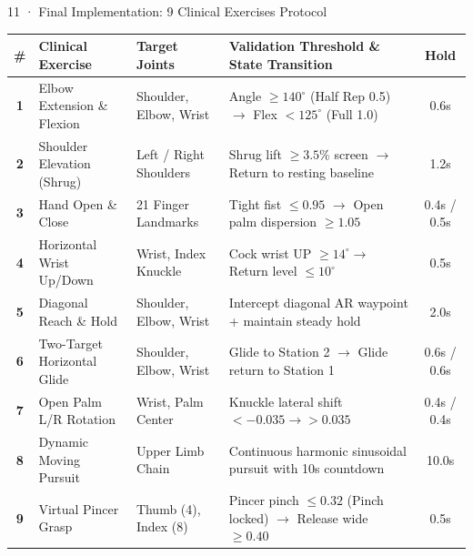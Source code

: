 \documentclass[aspectratio=169,11pt]{beamer}
\begin{document}
\begin{frame}{11 · Final Implementation: 9 Clinical Exercises Protocol}
\vspace{-2mm}
\centering
\setlength{\tabcolsep}{3pt}
\fontsize{7.5pt}{9.2pt}\selectfont
\renewcommand{\arraystretch}{1.06}
\begin{tabular}{cp{3.4cm}p{2.6cm}p{4.2cm}c}
\toprule
\textbf{\textcolor{DarkForest}{\#}} & 
\textbf{\textcolor{DarkForest}{Clinical Exercise}} & 
\textbf{\textcolor{DarkForest}{Target Joints}} & 
\textbf{\textcolor{DarkForest}{Validation Threshold \& State Transition}} & 
\textbf{\textcolor{DarkForest}{Hold}} \\
\midrule
\textbf{1} & Elbow Extension \& Flexion & Shoulder, Elbow, Wrist & Angle $\ge 140^\circ$ (Half Rep 0.5) $\rightarrow$ Flex $< 125^\circ$ (Full 1.0) & 0.6s \\
\textbf{2} & Shoulder Elevation (Shrug) & Left / Right Shoulders & Shrug lift $\ge 3.5\%$ screen $\rightarrow$ Return to resting baseline & 1.2s \\
\textbf{3} & Hand Open \& Close & 21 Finger Landmarks & Tight fist $\le 0.95$ $\rightarrow$ Open palm dispersion $\ge 1.05$ & 0.4s / 0.5s \\
\textbf{4} & Horizontal Wrist Up/Down & Wrist, Index Knuckle & Cock wrist UP $\ge 14^\circ \rightarrow$ Return level $\le 10^\circ$ & 0.5s \\
\textbf{5} & Diagonal Reach \& Hold & Shoulder, Elbow, Wrist & Intercept diagonal AR waypoint + maintain steady hold & 2.0s \\
\textbf{6} & Two-Target Horizontal Glide & Shoulder, Elbow, Wrist & Glide to Station 2 $\rightarrow$ Glide return to Station 1 & 0.6s / 0.6s \\
\textbf{7} & Open Palm L/R Rotation & Wrist, Palm Center & Knuckle lateral shift $<-0.035 \rightarrow >0.035$ & 0.4s / 0.4s \\
\textbf{8} & Dynamic Moving Pursuit & Upper Limb Chain & Continuous harmonic sinusoidal pursuit with 10s countdown & 10.0s \\
\textbf{9} & Virtual Pincer Grasp & Thumb (4), Index (8) & Pincer pinch $\le 0.32$ (Pinch locked) $\rightarrow$ Release wide $\ge 0.40$ & 0.5s \\
\bottomrule
\end{tabular}
\end{frame}
\end{document}
